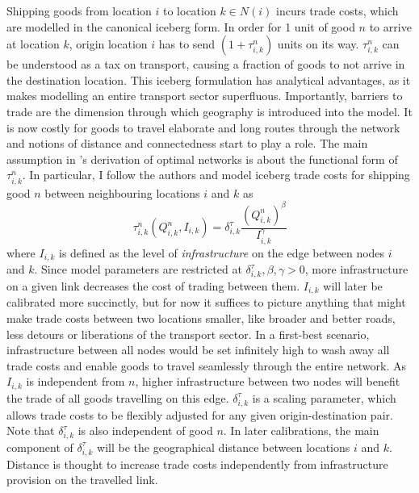 \documentclass[11pt, oneside]{article}   	%
\begin{document}
Shipping goods from location $i$ to location $k \in N(i)$ incurs trade costs, which are modelled in the canonical iceberg form. In order for 1 unit of good $n$ to arrive at location $k$, origin location $i$ has to send $(1+\tau_{i,k}^{n})$ units on its way. $\tau_{i,k}^{n}$ can be understood as a tax on transport, causing a fraction of goods to not arrive in the destination location. This iceberg formulation has analytical advantages, as it makes modelling an entire transport sector superfluous. Importantly, barriers to trade are the dimension through which geography is introduced into the model. It is now costly for goods to travel elaborate and long routes through the network and notions of distance and connectedness start to play a role. The main assumption in \citeauthor{fajgelbaum_optimal_2017}'s derivation of optimal networks is about the functional form of $\tau_{i,k}^{n}$. In particular, I follow the authors and model iceberg trade costs for shipping good $n$ between neighbouring locations $i$ and $k$ as
\begin{equation}
  \tau_{i,k}^{n}(Q_{i,k}^{n}, I_{i,k}) = \delta^{\tau}_{i,k} \frac{(Q_{i,k}^{n})^{\beta}}{I_{i,k}^{\gamma}}
  \label{eq:tau}
\end{equation}
where $I_{i,k}$ is defined as the level of \emph{infrastructure} on the edge between nodes $i$ and $k$. Since model parameters are restricted at $\delta^{\tau}_{i,k}, \beta, \gamma >0$, more infrastructure on a given link decreases the cost of trading between them. $I_{i,k}$ will later be calibrated more succinctly, but for now it suffices to picture anything that might make trade costs between two locations smaller, like broader and better roads, less detours or liberations of the transport sector. In a first-best scenario, infrastructure between all nodes would be set infinitely high to wash away all trade costs and enable goods to travel seamlessly through the entire network. As $I_{i,k}$ is independent from $n$, higher infrastructure between two nodes will benefit the trade of all goods travelling on this edge. $\delta^{\tau}_{i,k}$ is a scaling parameter, which allows trade costs to be flexibly adjusted for any given origin-destination pair. Note that $\delta^{\tau}_{i,k}$ is also  independent of good $n$. In later calibrations, the main component of $\delta^{\tau}_{i,k}$ will be the geographical distance between locations $i$ and $k$. Distance is thought to increase trade costs independently from infrastructure provision on the travelled link.
\end{document}
